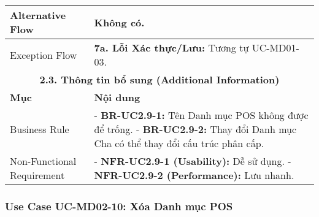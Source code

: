 \begin{longtable}{|m{4cm}|p{11cm}|}
\hline
Alternative Flow & Không có. \\
\hline
Exception Flow & \textbf{7a. Lỗi Xác thực/Lưu:} Tương tự UC-MD01-03. \\
\hline
\multicolumn{2}{|c|}{\textbf{2.3. Thông tin bổ sung (Additional Information)}} \\
\hline
\textbf{Mục} & \textbf{Nội dung} \\
\hline
Business Rule & - \textbf{BR-UC2.9-1:} Tên Danh mục POS không được để trống. \newline - \textbf{BR-UC2.9-2:} Thay đổi Danh mục Cha có thể thay đổi cấu trúc phân cấp. \\
\hline
Non-Functional Requirement & - \textbf{NFR-UC2.9-1 (Usability):} Dễ sử dụng. \newline - \textbf{NFR-UC2.9-2 (Performance):} Lưu nhanh. \\
\hline
\end{longtable}

\subsubsection{Use Case UC-MD02-10: Xóa Danh mục POS}

